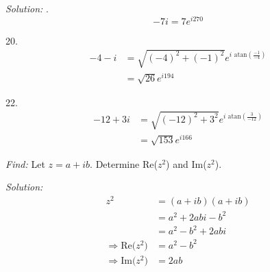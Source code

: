 \documentclass[11pt]{homework}
\begin{document}
\emph{Solution:}
.
\begin{equation*}
-7i = 7 e^{i270}
\end{equation*}

20.
\begin{align*}
-4 - i 
  &= \sqrt{(-4)^2 + (-1)^2} e^{i \text{ atan}(\frac{-1}{-4})} \\
  &= \sqrt{26} e^{i194}
\end{align*}

22.
\begin{align*}
-12 + 3i
  &= \sqrt{(-12)^2 + 3^2} e^{i \text{ atan}(\frac{3}{-12})} \\
  &= \sqrt{153} e^{i166}
\end{align*}


\emph{Find:}
\newline
Let $z=a+ib$. 
Determine Re($z^2$) and Im($z^2$).

\emph{Solution:}
\newline
\begin{align*}
z^2 &= (a+ib) (a+ib) \\
    &= a^2 +2abi - b^2  \\
    &= a^2 - b^2 + 2abi \\
\Rightarrow 
  \text{Re($z^2$)} &= a^2 - b^2 \\
\Rightarrow 
  \text{Im($z^2$)} &= 2ab \\
\end{align*}
\end{document}
